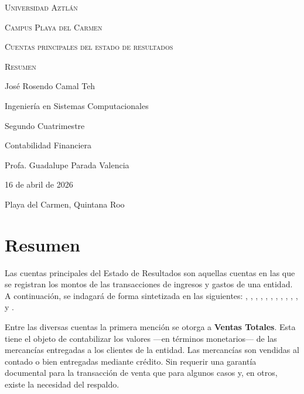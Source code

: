 \documentclass[12pt]{article}
\begin{document}
\begin{titlepage}
	\centering
	{\scshape\LARGE Universidad Aztlán \par}
	\vspace{1cm}
	{\scshape\Large Campus Playa del Carmen \par}
	\vspace{3cm}
	{\scshape\Huge Cuentas principales del estado de resultados \par}
	\vspace{1cm}
	{\scshape\Large Resumen \par}
	\vspace{3cm}
	{\Large José Rosendo Camal Teh \par}
	\vfill
	{\Large Ingeniería en Sistemas Computacionales \par}
	\vspace{0.5cm}
	{\Large Segundo Cuatrimestre \par}
	\vspace{0.5cm}
	{\Large Contabilidad Financiera \par}
	\vfill
	{\Large Profa. Guadalupe Parada Valencia \par}
	\vfill
	{\Large 16 de abril de 2026 \par}
	\vfill
	{\Large Playa del Carmen, Quintana Roo \par}
\end{titlepage}

\section*{Resumen}

Las cuentas principales del Estado de Resultados son aquellas cuentas en las que se registran los montos de las transacciones de ingresos y gastos de una entidad. A continuación, se indagará de forma sintetizada en las siguientes: , , , , , , , , , , ,  y .

Entre las diversas cuentas la primera mención se otorga a \textbf{Ventas Totales}. Esta tiene el objeto de contabilizar los valores ---en términos monetarios--- de las mercancías entregadas a los clientes de la entidad. Las mercancías son vendidas al contado o bien entregadas mediante crédito. Sin requerir una garantía documental para la transacción de venta que para algunos casos y, en otros, existe la necesidad del respaldo.
\end{document}
